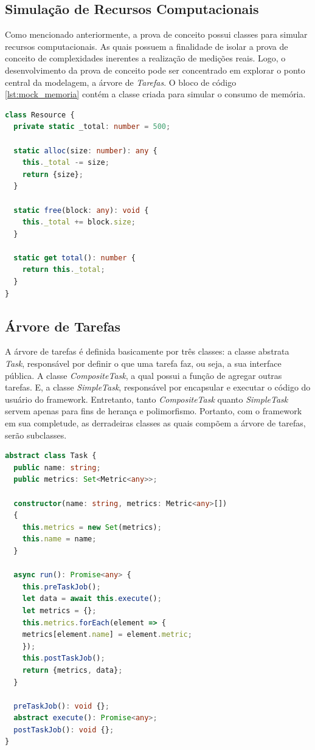 \documentclass[12pt]{tcc}
\begin{document}
\subsection{Simulação de Recursos Computacionais}
Como mencionado anteriormente, a prova de conceito possui classes para simular recursos computacionais.
As quais possuem a finalidade de isolar a prova de conceito de complexidades inerentes a realização de medições reais.
Logo, o desenvolvimento da prova de conceito pode ser concentrado em explorar o ponto central da modelagem, a árvore de \emph{Tarefas}.
O bloco de código \ref{lst:mock_memoria} contém a classe criada para simular o consumo de memória.

\begin{lstlisting}[label={lst:mock_memoria}, caption={Implementação da classe responsável por simular recursos de memória para a prova de conceito do framework.}, language=TypeScript]
class Resource {
  private static _total: number = 500;

  static alloc(size: number): any {
    this._total -= size;
    return {size};
  }

  static free(block: any): void {
    this._total += block.size;
  }

  static get total(): number {
    return this._total;
  }
}
\end{lstlisting}


\subsection{Árvore de Tarefas}
\label{task-tree}

A árvore de tarefas é definida basicamente por três classes:
a classe abstrata \emph{Task}, responsável por definir o que uma tarefa faz, ou seja, a sua interface pública.
A classe \emph{CompositeTask}, a qual possui a função de agregar outras tarefas.
E, a classe \emph{SimpleTask}, responsável por encapsular e executar o código do usuário do framework.
Entretanto, tanto \emph{CompositeTask} quanto \emph{SimpleTask} servem apenas para fins de herança e polimorfismo.
Portanto, com o framework em sua completude, as derradeiras classes as quais compõem a árvore de tarefas, serão subclasses.

\begin{lstlisting}[label={lst:abstract_task}, caption={Classe abstrata responsável por definir o que todos os membros da árvore de tarefas precisam implementar.}, language=TypeScript]
abstract class Task {
  public name: string;
  public metrics: Set<Metric<any>>;

  constructor(name: string, metrics: Metric<any>[])
  {
    this.metrics = new Set(metrics);
    this.name = name;
  }

  async run(): Promise<any> {
    this.preTaskJob();
    let data = await this.execute();
    let metrics = {};
    this.metrics.forEach(element => {
    metrics[element.name] = element.metric;
    });
    this.postTaskJob();
    return {metrics, data};
  }

  preTaskJob(): void {};
  abstract execute(): Promise<any>;
  postTaskJob(): void {};
}
\end{lstlisting}
\end{document}
